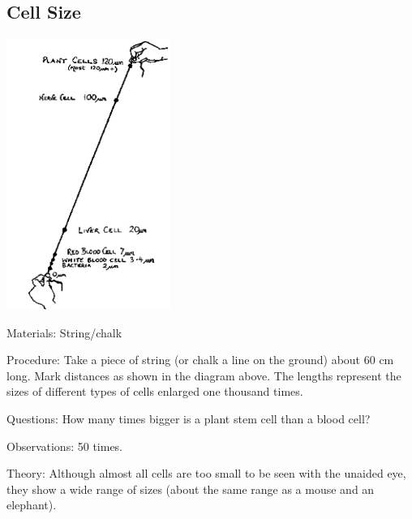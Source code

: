 \begin{multicols}{2}
\vfill
\columnbreak

\subsection{Cell Size}

\begin{center}
\includegraphics[width=0.4\textwidth]{./img/source/cell-size.png}
\end{center}

\begin{description*}
\item[Materials:]{String/chalk}
\item[Procedure:]{Take a piece of string (or chalk a line on the ground) about 60 cm long. Mark distances as
shown in the diagram above. The lengths represent the sizes of different types of cells
enlarged one thousand times.}
\item[Questions:]{How many times bigger is a plant stem cell than a blood cell?}
\item[Observations:]{50 times.}
\item[Theory:]{Although almost all cells are too small to be seen with the unaided eye, they show a wide
range of sizes (about the same range as a mouse and an elephant).}
\end{description*}



\end{multicols}

\pagebreak